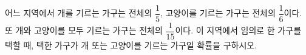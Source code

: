 어느 지역에서 개를 기르는 가구는 전체의 $\dfrac{1}{5}$, 고양이를 기르는 가구는 전체의 $\dfrac{1}{6}$이다. 또 개와 고양이를 모두 기르는 가구는 전체의 $\dfrac{1}{15}$이다. 이 지역에서 임의로 한 가구를 택할 때, 택한 가구가 개 또는 고양이를 기르는 가구일 확률을 구하시오.
